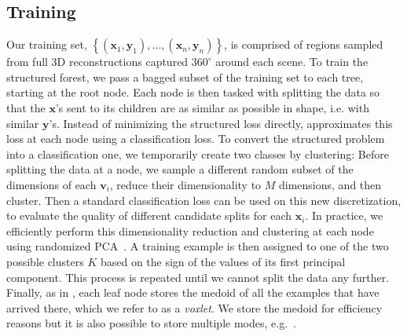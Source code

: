 \documentclass[10pt,twocolumn,letterpaper]{article}
\makeatletter
\renewcommand*{\eg}{e.g.\@\xspace}
\renewcommand*{\ie}{i.e.\@\xspace}
\makeatother
\begin{document}
\subsection{Training}
Our training set, $\left\{(\mathbf{x}_1, \mathbf{y}_1), ..., (\mathbf{x}_n, \mathbf{y}_n)\right\}$, is comprised of regions sampled from full 3D reconstructions captured $360^{\circ}$ around each scene.
To train the structured forest, we pass a bagged subset of the training set to each tree, starting at the root node.
Each node is then tasked with splitting the data so that the $\mathbf{x}$'s sent to its children are as similar as possible in shape, \ie with similar $\mathbf{y}$'s.
Instead of minimizing the structured loss directly, \cite{dollar-iccv-2013} approximates this loss at each node using a classification loss.
To convert the structured problem into a classification one, we temporarily create two classes by clustering: Before splitting the data at a node, we sample a different random subset of the dimensions of each $\mathbf{v}_i$, reduce their dimensionality to $M$ dimensions, and then cluster.
Then a standard classification loss can be used on this new discretization, to evaluate the quality of different candidate splits for each $\mathbf{x}_i$.
In practice, we efficiently perform this dimensionality reduction and clustering at each node using randomized PCA~\cite{halko-siam-2011}.
A training example is then assigned to one of the two possible clusters $K$ based on the sign of the values of its first principal component.
This process is repeated until we cannot split the data any further.
Finally, as in \cite{dollar-iccv-2013}, each leaf node stores the medoid of all the examples that have arrived there, which we refer to as a \emph{voxlet}.
We store the medoid for efficiency reasons but it is also possible to store multiple modes, \eg~\cite{girshick2011efficient}.
\end{document}
